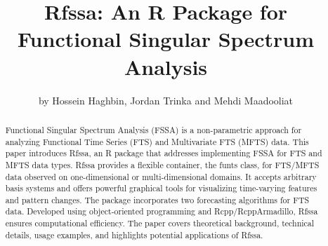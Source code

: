 \title{Rfssa: An R Package for Functional Singular Spectrum Analysis}
\author{by Hossein Haghbin, Jordan Trinka and Mehdi Maadooliat}
\maketitle
\begin{abstract}
Functional Singular Spectrum Analysis (FSSA) is a non-parametric approach for analyzing Functional Time Series (FTS) and Multivariate FTS (MFTS) data. This paper introduces Rfssa, an R package that addresses implementing FSSA for FTS and MFTS data types. Rfssa provides a flexible container, the funts class, for FTS/MFTS data observed on one-dimensional or multi-dimensional domains. It accepts arbitrary basis systems and offers powerful graphical tools for visualizing time-varying features and pattern changes. The package incorporates two forecasting algorithms for FTS data. Developed using object-oriented programming and Rcpp/RcppArmadillo, Rfssa ensures computational efficiency. The paper covers theoretical background, technical details, usage examples, and highlights potential applications of Rfssa.
\end{abstract}
